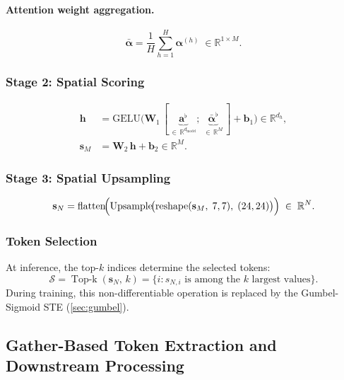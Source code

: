 \documentclass[11pt,a4paper]{article}
\DeclareMathOperator{\TopK}{Top\text{-}k}
\DeclareMathOperator{\Upsample}{Upsample}
\DeclareMathOperator{\reshape}{reshape}
\DeclareMathOperator{\flatten}{flatten}
\newcommand{\R}{\mathbb{R}}
\newcommand{\vs}{\mathbf{s}}
\begin{document}
\paragraph{Attention weight aggregation.}
\begin{equation}
  \bar{\boldsymbol{\alpha}} =
    \frac{1}{H} \sum_{h=1}^{H} \boldsymbol{\alpha}^{(h)}
    \;\in \R^{1 \times M}.
  \label{eq:alpha_avg}
\end{equation}

\subsubsection{Stage 2: Spatial Scoring}

\begin{align}
  \mathbf{h} &= \mathrm{GELU}\!\bigl(
    \mathbf{W}_1 \,
    [\,\underbrace{\mathbf{a}^{\flat}}_{\in\,\R^{d_{\mathrm{model}}}};\;
     \underbrace{\bar{\boldsymbol{\alpha}}^{\flat}}_{\in\,\R^{M}}\,]
    + \mathbf{b}_1
  \bigr) \in \R^{d_h},
  \label{eq:mlp_hidden} \\
  \vs_M &= \mathbf{W}_2\, \mathbf{h} + \mathbf{b}_2 \in \R^{M}.
  \label{eq:score_coarse}
\end{align}

\subsubsection{Stage 3: Spatial Upsampling}

\begin{equation}
  \vs_N = \flatten\!\Bigl(
    \Upsample\!\bigl(
      \reshape(\vs_M,\; 7, 7),\;
      (24, 24)
    \bigr)
  \Bigr) \;\in\; \R^{N}.
  \label{eq:upsample}
\end{equation}

\subsubsection{Token Selection}

At inference, the top-$k$ indices determine the selected tokens:
\begin{equation}
  \mathcal{S} = \TopK(\vs_N,\, k)
    = \{i : s_{N,i} \text{ is among the $k$ largest values}\}.
  \label{eq:topk}
\end{equation}
During training, this non-differentiable operation is replaced by the
Gumbel-Sigmoid STE (\cref{sec:gumbel}).

\subsection{Gather-Based Token Extraction and Downstream Processing}
\label{subsec:gather}
\end{document}
